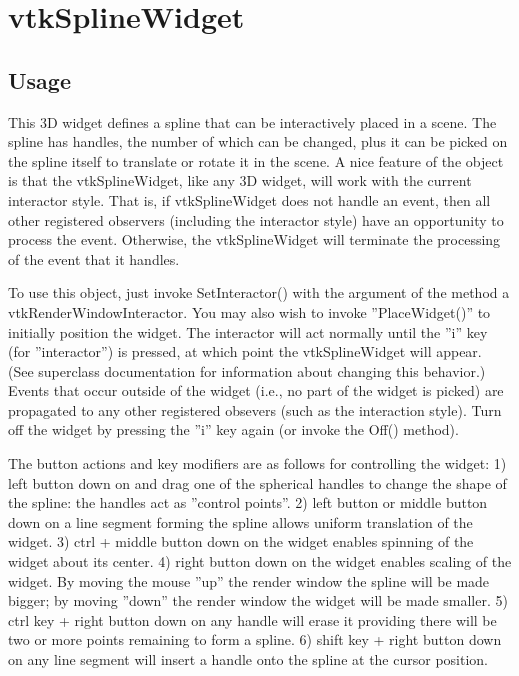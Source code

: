 \section{vtkSplineWidget}

\subsection{Usage}

 This 3D widget defines a spline that can be interactively placed in a
 scene. The spline has handles, the number of which can be changed, plus it
 can be picked on the spline itself to translate or rotate it in the scene.
 A nice feature of the object is that the vtkSplineWidget, like any 3D
 widget, will work with the current interactor style. That is, if
 vtkSplineWidget does not handle an event, then all other registered
 observers (including the interactor style) have an opportunity to process
 the event. Otherwise, the vtkSplineWidget will terminate the processing of
 the event that it handles.

 To use this object, just invoke SetInteractor() with the argument of the
 method a vtkRenderWindowInteractor.  You may also wish to invoke
 ''PlaceWidget()'' to initially position the widget. The interactor will act
 normally until the ''i'' key (for ''interactor'') is pressed, at which point the
 vtkSplineWidget will appear. (See superclass documentation for information
 about changing this behavior.) Events that occur outside of the widget
 (i.e., no part of the widget is picked) are propagated to any other
 registered obsevers (such as the interaction style).  Turn off the widget
 by pressing the ''i'' key again (or invoke the Off() method).

 The button actions and key modifiers are as follows for controlling the
 widget:
 1) left button down on and drag one of the spherical handles to change the
 shape of the spline: the handles act as ''control points''.
 2) left button or middle button down on a line segment forming the spline
 allows uniform translation of the widget.
 3) ctrl + middle button down on the widget enables spinning of the widget
 about its center.
 4) right button down on the widget enables scaling of the widget. By moving
 the mouse ''up'' the render window the spline will be made bigger; by moving
 ''down'' the render window the widget will be made smaller.
 5) ctrl key + right button down on any handle will erase it providing there
 will be two or more points remaining to form a spline.
 6) shift key + right button down on any line segment will insert a handle
 onto the spline at the cursor position.


